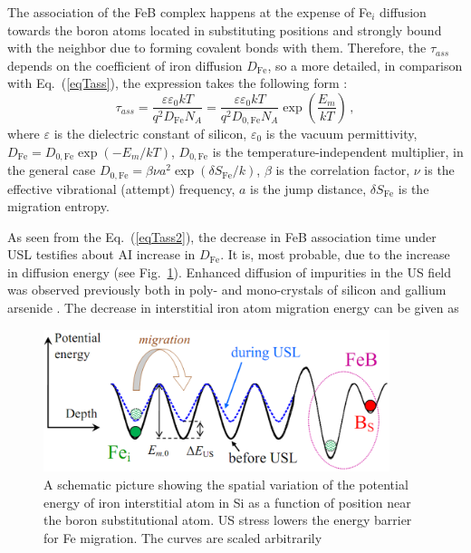 \documentclass[sn-mathphys]{sn-jnl}%
\theoremstyle{thmstyleone}%
\theoremstyle{thmstyletwo}%
\theoremstyle{thmstylethree}%
\begin{document}
The association of the FeB complex happens at the expense of  Fe$_i$ diffusion towards the
boron atoms located in substituting positions and strongly bound with the neighbor due to forming covalent bonds with them.
Therefore, the $\tau_{ass}$ depends on the coefficient of iron diffusion $D_\mathrm{Fe}$,
so a more detailed, in comparison with Eq.~(\ref{eqTass}), the expression takes the following form \cite{FeBAssJAP2014,FeBJAP2005,FeBKin2019}:
\begin{equation}
\label{eqTass2}
\tau_{ass}=\frac{\varepsilon\varepsilon_0 kT}{q^2D_\mathrm{Fe}N_A}=
\frac{\varepsilon\varepsilon_0 kT}{q^2D_\mathrm{0,Fe}N_A}\exp\left(\frac{E_m}{kT}\right)\,,
\end{equation}
where
$\varepsilon$ is the dielectric constant of silicon,
$\varepsilon_0$ is the vacuum permittivity,
$D_\mathrm{Fe}=D_\mathrm{0,Fe}\exp(-E_m/kT)$,
$D_\mathrm{0,Fe}$ is the temperature-independent multiplier,
in the general case \cite{AZIZ2001,Stavola,WeberFe}
$D_\mathrm{0,Fe}=\beta\nu a^2\exp(\delta S_\mathrm{Fe}/k)$,
$\beta$ is the correlation factor,
$\nu$  is the effective vibrational (attempt) frequency,
$a$ is the jump distance,
$\delta S_\mathrm{Fe}$ is the migration entropy.

As seen from the Eq.~(\ref{eqTass2}), the decrease in FeB association time under USL testifies about
AI increase in $D_\mathrm{Fe}$.
It is, most probable, due to the increase in diffusion energy (see Fig.~\ref{figUSChem}).
Enhanced diffusion of impurities in the US field was observed previously
both in poly- and mono-crystals of silicon and gallium arsenide \cite{Ostapenko1999,Zaveryukhin2002}.
The decrease in interstitial iron atom migration energy can be given as
\begin{figure}
\centering
 \includegraphics[width=0.9\textwidth]{Fig7}
\caption{
A schematic picture showing the spatial variation of the potential energy of
iron interstitial atom in Si as a function of position near the boron substitutional atom.
US stress lowers the energy barrier for Fe migration.
The curves are scaled arbitrarily
}
\label{figUSChem}       %
\end{figure}
\end{document}

